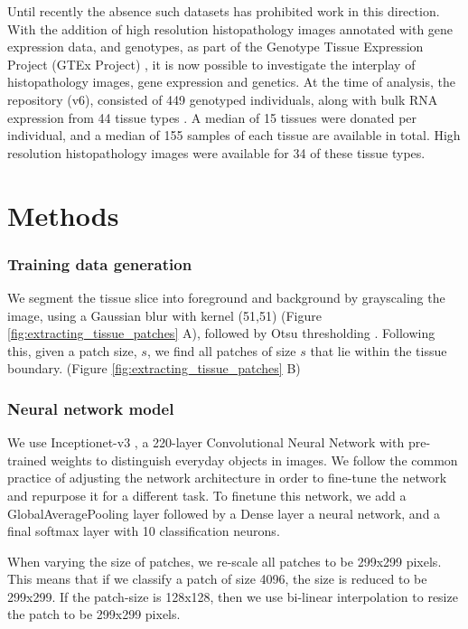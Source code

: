 \documentclass{article}
\begin{document}
Until recently the absence such datasets has prohibited work in this direction. With the addition of high resolution histopathology images annotated with gene expression data, and genotypes, as part of the Genotype Tissue Expression Project (GTEx Project) \cite{GTEx-project}, it is now possible to investigate the interplay of histopathology images, gene expression and genetics. At the time of analysis, the repository (v6), consisted of 449 genotyped individuals, along with bulk RNA expression from 44 tissue types \cite{GTEx-histology}. A median of 15 tissues were donated per individual, and a median of 155 samples of each tissue are available in total. High resolution histopathology images were available for 34 of these tissue types.

\section{Methods}

\subsubsection{Training data generation}

We segment the tissue slice into foreground and background by grayscaling the image, using a Gaussian blur \cite{shapiro-computer-vision} with kernel (51,51) (Figure \ref{fig:extracting_tissue_patches} \textcolor{ao(english)}{A}), followed by Otsu thresholding \cite{otsu-method}. Following this, given a patch size, $s$, we find all patches of size $s$ that lie within the tissue boundary. (Figure \ref{fig:extracting_tissue_patches} \textcolor{ao(english)}{B})


\subsubsection{Neural network model}
We use Inceptionet-v3 \cite{inception}, a 220-layer Convolutional Neural Network with pre-trained weights to distinguish everyday objects in images. We follow the common practice of adjusting the network architecture in order to fine-tune the network and repurpose it for a different task. To finetune this network, we add a GlobalAveragePooling layer \cite{network-in-network} followed by a Dense layer a neural network, and a final softmax layer with 10 classification neurons.

When varying the size of patches, we re-scale all patches to be 299x299 pixels. This means that if we classify a patch of size 4096, the size is reduced to be 299x299. If the patch-size is 128x128, then we use bi-linear interpolation to resize the patch to be 299x299 pixels. 
\end{document}
